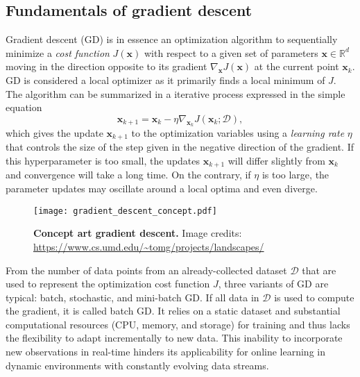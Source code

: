 
\subsection{Fundamentals of gradient descent}

Gradient descent (GD) is in essence an optimization algorithm to sequentially minimize a \emph{cost function} $J(\bm{x})$ with respect to a given set of parameters $\bm{x} \in \mathbb{R}^d$ moving in the direction opposite to its gradient $\nabla_{\bm{x}}J(\bm{x})$ at the current point $\bm{x}_k$. GD is considered a local optimizer as it primarily finds a local minimum of $J$. The algorithm can be summarized in a iterative process expressed in the simple equation
\begin{equation}\label{eq:gradient_descent}
	\bm{x}_{k+1} = \bm{x}_k - \eta  \nabla_{\bm{x}_k} J(\bm{x}_k;\mathcal{D}),
\end{equation}  
which gives the update $\bm{x}_{k+1}$ to the optimization variables using a \emph{learning rate} $\eta$ that controls the size of the step given in the negative direction of the gradient. If this hyperparameter is too small, the updates $\bm{x}_{k+1}$ will differ slightly from $\bm{x}_k$ and convergence will take a long time. On the contrary, if $\eta$ is too large, the parameter updates may oscillate around a local optima and even diverge. 
\begin{figure*}[t!]
	\begin{center}
		\texttt{[image: gradient\_descent\_concept.pdf]}
	\end{center}
	\caption{\textbf{Concept art gradient descent.} Image credits: \url{https://www.cs.umd.edu/~tomg/projects/landscapes/}}
\end{figure*}
From the number of data points from an already-collected dataset $\mathcal{D}$ that are used to represent the optimization cost function $J$, three variants of GD are typical: batch, stochastic, and mini-batch GD. If all data in $\mathcal{D}$ is used to compute the gradient, it is called batch GD. It relies on a static dataset and substantial computational resources (CPU, memory, and storage) for training and thus lacks the flexibility to adapt incrementally to new data. This inability to incorporate new observations in real-time hinders its applicability for online learning in dynamic environments with constantly evolving data streams. 

